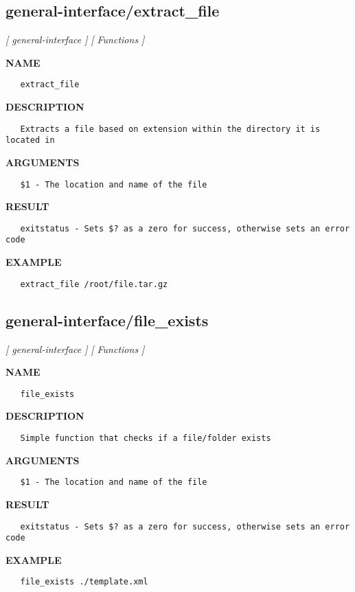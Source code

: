 \subsection{general-interface/extract\_file}
\textsl{[ general-interface ]}
\textsl{[ Functions ]}

\label{ch:robo20}
\label{ch:general_interface_extract_file}
\textbf{NAME}
\begin{verbatim}
   extract_file
\end{verbatim}
\textbf{DESCRIPTION}
\begin{verbatim}
   Extracts a file based on extension within the directory it is located in
\end{verbatim}
\textbf{ARGUMENTS}
\begin{verbatim}
   $1 - The location and name of the file
\end{verbatim}
\textbf{RESULT}
\begin{verbatim}
   exitstatus - Sets $? as a zero for success, otherwise sets an error code
\end{verbatim}
\textbf{EXAMPLE}
\begin{verbatim}
   extract_file /root/file.tar.gz
\end{verbatim}
\newpage
\subsection{general-interface/file\_exists}
\textsl{[ general-interface ]}
\textsl{[ Functions ]}

\label{ch:robo21}
\label{ch:general_interface_file_exists}
\textbf{NAME}
\begin{verbatim}
   file_exists
\end{verbatim}
\textbf{DESCRIPTION}
\begin{verbatim}
   Simple function that checks if a file/folder exists
\end{verbatim}
\textbf{ARGUMENTS}
\begin{verbatim}
   $1 - The location and name of the file
\end{verbatim}
\textbf{RESULT}
\begin{verbatim}
   exitstatus - Sets $? as a zero for success, otherwise sets an error code
\end{verbatim}
\textbf{EXAMPLE}
\begin{verbatim}
   file_exists ./template.xml
\end{verbatim}
\newpage
